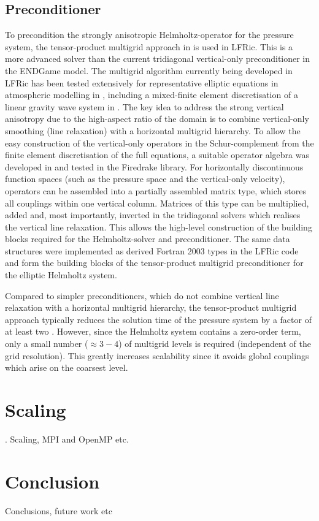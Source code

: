 \documentclass[times]{elsarticle}
\begin{document}
\subsection{\label{sec:preconditioner}Preconditioner}
To precondition the strongly anisotropic Helmholtz-operator for the
pressure system, the tensor-product multigrid approach in
\cite{Borm2001} is used in LFRic. This is a more advanced solver than
the current tridiagonal vertical-only preconditioner in the ENDGame
model. The multigrid algorithm currently being developed in LFRic has been tested
extensively for representative elliptic equations in atmospheric
modelling in \cite{Mueller2014,Dedner2016}, including a mixed-finite
element discretisation of a linear gravity wave system in
\cite{Mitchell2016}. The key idea to address the strong vertical
anisotropy due to the high-aspect ratio of the domain is to combine
vertical-only smoothing (line relaxation) with a horizontal multigrid
hierarchy. To allow the easy construction of the vertical-only
operators in the Schur-complement from the finite element
discretisation of the full equations, a suitable operator algebra was
developed in \cite{Mitchell2016} and tested in the Firedrake
library. For horizontally discontinuous function spaces (such as the
pressure space and the vertical-only velocity), operators can be
assembled into a partially assembled matrix type, which stores all
couplings within one vertical column. Matrices of this type can be
multiplied, added and, most importantly, inverted in the tridiagonal
solvers which realises the vertical line relaxation. This allows the
high-level construction of the building blocks required for the
Helmholtz-solver and preconditioner. The same data structures were
implemented as derived Fortran 2003 types in the LFRic code and form
the building blocks of the tensor-product multigrid preconditioner for
the elliptic Helmholtz system.

Compared to simpler preconditioners, which do not combine vertical
line relaxation with a horizontal multigrid hierarchy, the
tensor-product multigrid approach typically reduces the solution time
of the pressure system by a factor of at least two
\cite{Mueller2014,Mitchell2016}. However, since the Helmholtz system
contains a zero-order term, only a small number ($\approx 3-4$) of
multigrid levels is required (independent of the grid
resolution). This greatly increases scalability since it avoids global
couplings which arise on the coarsest level.

\section{\label{sec:scal}Scaling}.
Scaling, MPI and OpenMP etc.

\section{Conclusion}
\label{sec:con}
Conclusions, future work etc



\end{document}
